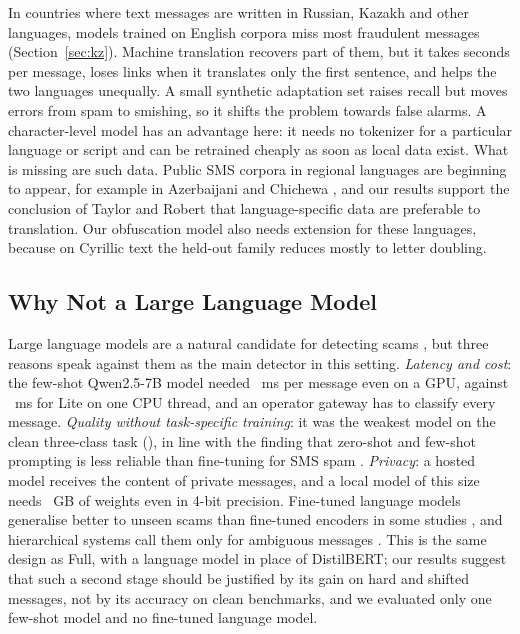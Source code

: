 In countries where text messages are written in Russian, Kazakh and other languages, models trained on English corpora miss most fraudulent messages (Section~\ref{sec:kz}). Machine translation recovers part of them, but it takes seconds per message, loses links when it translates only the first sentence, and helps the two languages unequally. A small synthetic adaptation set raises recall but moves errors from spam to smishing, so it shifts the problem towards false alarms. A character-level model has an advantage here: it needs no tokenizer for a particular language or script and can be retrained cheaply as soon as local data exist. What is missing are such data. Public SMS corpora in regional languages are beginning to appear, for example in Azerbaijani \cite{shahbazov2026} and Chichewa \cite{taylor2025}, and our results support the conclusion of Taylor and Robert \cite{taylor2025} that language-specific data are preferable to translation. Our obfuscation model also needs extension for these languages, because on Cyrillic text the held-out family reduces mostly to letter doubling.

\subsection{Why Not a Large Language Model}\label{sec:llm}

Large language models are a natural candidate for detecting scams \cite{salman2025spallm,topcuoglu2026}, but three reasons speak against them as the main detector in this setting. \emph{Latency and cost}: the few-shot Qwen2.5-7B model needed ~ms per message even on a GPU, against ~ms for Lite on one CPU thread, and an operator gateway has to classify every message. \emph{Quality without task-specific training}: it was the weakest model on the clean three-class task (), in line with the finding that zero-shot and few-shot prompting is less reliable than fine-tuning for SMS spam \cite{salman2025spallm}. \emph{Privacy}: a hosted model receives the content of private messages, and a local model of this size needs ~GB of weights even in 4-bit precision. Fine-tuned language models generalise better to unseen scams than fine-tuned encoders in some studies \cite{topcuoglu2026}, and hierarchical systems call them only for ambiguous messages \cite{chang2025scamshield}. This is the same design as Full, with a language model in place of DistilBERT; our results suggest that such a second stage should be justified by its gain on hard and shifted messages, not by its accuracy on clean benchmarks, and we evaluated only one few-shot model and no fine-tuned language model.

